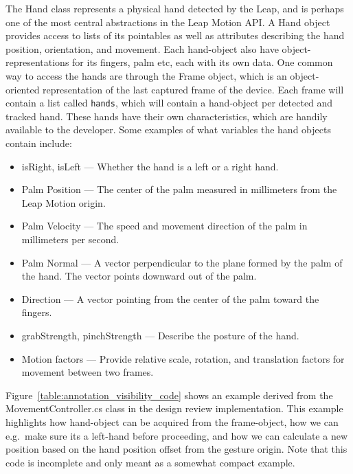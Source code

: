 The Hand class represents a physical hand detected by the Leap, and is perhaps one of the most central abstractions in the Leap Motion API. 
A Hand object provides access to lists of its pointables as well as attributes describing the hand position, orientation, and movement.
Each hand-object also have object-representations for its fingers, palm etc, each with its own data.
One common way to access the hands are through the Frame object, which is an object-oriented representation of the last captured frame of the device.
Each frame will contain a list called \texttt{hands}, which will contain a hand-object per detected and tracked hand.
These hands have their own characteristics, which are handily available to the developer. 
Some examples of what variables the hand objects contain include:

\begin{itemize}
\item isRight, isLeft — Whether the hand is a left or a right hand.
\item Palm Position — The center of the palm measured in millimeters from the Leap Motion origin.
\item Palm Velocity — The speed and movement direction of the palm in millimeters per second.
\item Palm Normal — A vector perpendicular to the plane formed by the palm of the hand. The vector points downward out of the palm.
\item Direction — A vector pointing from the center of the palm toward the fingers.
\item grabStrength, pinchStrength — Describe the posture of the hand.
\item Motion factors — Provide relative scale, rotation, and translation factors for movement between two frames.
\end{itemize}

Figure~\vref{table:annotation_visibility_code} shows an example derived from the MovementController.cs class in the design review implementation. 
This example highlights how hand-object can be acquired from the frame-object, how we can e.g.~make sure its a left-hand
before proceeding, and how we can calculate a new position based on the hand position offset from the gesture origin.
Note that this code is incomplete and only meant as a somewhat compact example.

